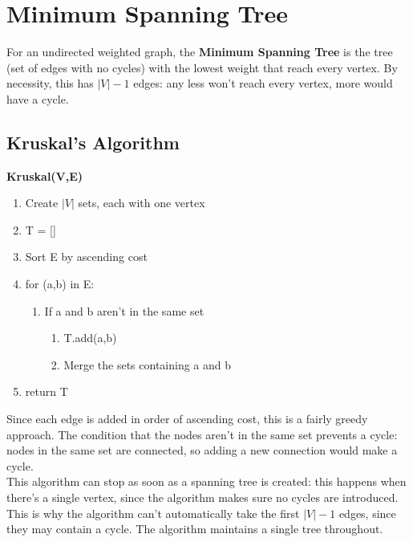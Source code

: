 \section{Minimum Spanning Tree}
For an undirected weighted graph, the \textbf{Minimum Spanning Tree} is the tree (set of edges with no cycles) with the lowest weight that reach every vertex. By necessity, this has $|V|-1$ edges: any less won't reach every vertex, more would have a cycle.

\subsection{Kruskal's Algorithm}
\textbf{Kruskal(V,E)}
\begin{enumerate}
    \item Create $|V|$ sets, each with one vertex
    \item T = []
    \item Sort E by ascending cost
    \item for (a,b) in E:
    \begin{enumerate}
        \item [] If a and b aren't in the same set
        \begin{enumerate}
            \item T.add(a,b)
            \item Merge the sets containing a and b
        \end{enumerate}
    \end{enumerate}
    \item return T
\end{enumerate} 
Since each edge is added in order of ascending cost, this is a fairly greedy approach. The condition that the nodes aren't in the same set prevents a cycle: nodes in the same set are connected, so adding a new connection would make a cycle. \\
This algorithm can stop as soon as a spanning tree is created: this happens when there's a single vertex, since the algorithm makes sure no cycles are introduced. This is why the algorithm can't automatically take the first $|V|-1$ edges, since they may contain a cycle. The algorithm maintains a single tree throughout. 

\newpage
